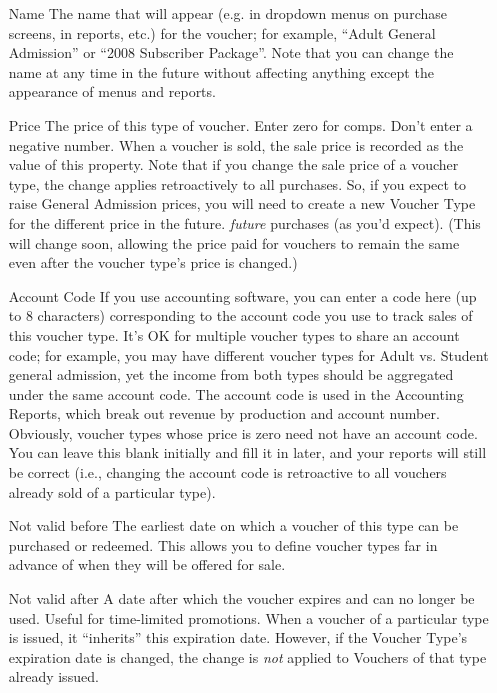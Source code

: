 \begin{itemize}
\item[Name] The name that will appear (e.g. in dropdown menus on
  purchase screens, in reports, etc.) for the voucher; for example,
  ``Adult General Admission'' or ``2008 Subscriber Package''.  Note that
  you can change the name at any time in the future without affecting
  anything except the appearance of menus and reports.
\item[Price] The price of this type of voucher.  Enter zero for comps.
  Don't enter a negative number.  When a voucher is sold, the sale price
  is recorded as the value of this property.  Note that if you change
  the sale price of a voucher type, the change applies retroactively to
  all purchases.    So, if you expect
  to raise General Admission prices, you will need to create a new
  Voucher Type for the different price in the future.
  \emph{future} purchases (as you'd expect).  (This will change soon,
  allowing the price paid for vouchers to remain the same even after the
  voucher type's price is changed.)
\item[Account Code] If you use accounting software, you can enter a code
  here (up to 8 characters) corresponding to the account code you use to
  track sales of this voucher type.  It's OK for multiple voucher types
  to share an account code; for example, you may have different voucher
  types for Adult vs. Student general admission, yet the income from
  both types should be aggregated under the same account code.  The
  account code is used in the Accounting Reports, which break out
  revenue by production and account number.  Obviously, voucher types
  whose price is zero need not have an account code.  You can leave this
  blank initially and fill it in later, and your reports will still be
  correct (i.e., changing the account code is retroactive to all
  vouchers already sold of a particular type).
\item[Not valid before] The earliest date on which a voucher of this
  type can be purchased or redeemed. This allows you to define voucher
  types far in advance of when they will be offered for sale.
\item[Not valid after] A date after which the voucher expires and can no
  longer be used.  Useful for time-limited promotions.  When a voucher
  of a particular type is issued, it ``inherits'' this expiration date.
  However, if the Voucher Type's expiration date is changed, the change
  is \emph{not} applied to Vouchers of that type already issued.


\end{itemize}
